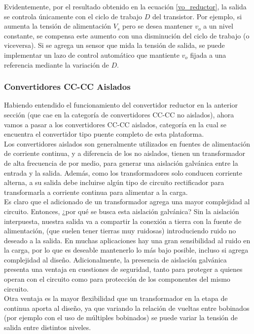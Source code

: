 Evidentemente, por el resultado obtenido en la ecuación \ref{vo_reductor}, la salida se controla únicamente con el ciclo de trabajo $D$ del transistor. Por ejemplo, si aumenta la tensión de alimentación $V_s$ pero se desea mantener $v_o$ a un nivel constante, se compensa este aumento con una disminución del ciclo de trabajo (o viceversa). Si se agrega un sensor que mida la tensión de salida, se puede implementar un lazo de control automático que mantiente $v_o$ fijada a una referencia mediante la variación de $D$.\\

\subsubsection{Convertidores CC-CC Aislados}

Habiendo entendido el funcionamiento del convertidor reductor en la anterior sección (que cae en la categoría de convertidores CC-CC no aislados), ahora vamos a pasar a los convertidores CC-CC aislados, categoría en la cual se encuentra el convertidor tipo puente completo de esta plataforma.\\

Los convertidores aislados son generalmente utilizados en fuentes de alimentación de corriente continua, y a diferencia de los no aislados, tienen un transformador de alta frecuencia de por medio, para generar una {\Medium aislación galvánica entre la entrada y la salida}. Además, como los transformadores solo conducen corriente alterna, a su salida debe incluirse algún tipo de circuito rectificador para transformarla a corriente continua para alimentar a la carga.\\

Es claro que el adicionado de un transformador agrega una mayor complejidad al circuito. Entonces, ¿por qué se busca esta aislación galvánica? Sin la aislación interpuesta, nuestra salida va a compartir la conexión a tierra con la fuente de alimentación, (que suelen tener tierras muy ruidosas) introduciendo ruido no deseado a la salida. En muchas aplicaciones hay una gran sensibilidad al ruido en la carga, por lo que es deseable mantenerlo lo más bajo posible, incluso si agrega complejidad al diseño. Adicionalmente, la presencia de aislación galvánica presenta una ventaja en cuestiones de seguridad, tanto para proteger a quienes operan con el circuito como para protección de los componentes del mismo circuito.\\

Otra ventaja es la mayor flexibilidad que un transformador en la etapa de continua aporta al diseño, ya que variando la relación de vueltas entre bobinados (por ejemplo con el uso de múltiples bobinados) se puede variar la tensión de salida entre distintos niveles.\\

